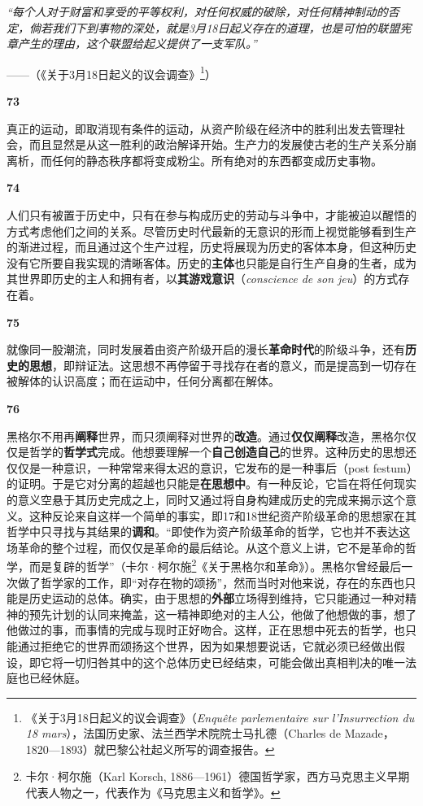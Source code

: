 \documentclass[fontset=fandol, a4paper, 12pt, openright]{ctexbook}
\makeatletter
\renewenvironment{quote}
  {\list{}{\rightmargin\leftmargin}%
   \item\relax\small\itshape\color{darkgray}}
  {\endlist}
\newcommand{\thesis}[1]{%
    \par\vspace{1.5em}%
    {\centering \textbf{\Large #1}\par}%
    \nobreak\vspace{0.5em}\nobreak
    \@afterindenttrue %
    \@afterheading    %
}
\makeatother
\begin{document}
\begin{quote}
“每个人对于财富和享受的平等权利，对任何权威的破除，对任何精神制动的否定，倘若我们下到事物的深处，就是3月18日起义存在的道理，也是可怕的联盟宪章产生的理由，这个联盟给起义提供了一支军队。”

\begin{flushright}
——（《关于3月18日起义的议会调查》\footnote{《关于3月18日起义的议会调查》（\textit{Enquête parlementaire sur l'Insurrection du 18 mars}），法国历史家、法兰西学术院院士马扎德（Charles de Mazade，1820—1893）就巴黎公社起义所写的调查报告。}）
\end{flushright}
\end{quote}

\thesis{73}
真正的运动，即取消现有条件的运动，从资产阶级在经济中的胜利出发去管理社会，而且显然是从这一胜利的政治解译开始。生产力的发展使古老的生产关系分崩离析，而任何的静态秩序都将变成粉尘。所有绝对的东西都变成历史事物。

\thesis{74}
人们只有被置于历史中，只有在参与构成历史的劳动与斗争中，才能被迫以醒悟的方式考虑他们之间的关系。尽管历史时代最新的无意识的形而上视觉能够看到生产的渐进过程，而且通过这个生产过程，历史将展现为历史的客体本身，但这种历史没有它所要自我实现的清晰客体。历史的\textbf{主体}也只能是自行生产自身的生者，成为其世界即历史的主人和拥有者，以\textbf{其游戏意识}（\textit{conscience de son jeu}）的方式存在着。

\thesis{75}
就像同一股潮流，同时发展着由资产阶级开启的漫长\textbf{革命时代}的阶级斗争，还有\textbf{历史的思想}，即辩证法。这思想不再停留于寻找存在者的意义，而是提高到一切存在被解体的认识高度；而在运动中，任何分离都在解体。

\thesis{76}
黑格尔不用再\textbf{阐释}世界，而只须阐释对世界的\textbf{改造}。通过\textbf{仅仅阐释}改造，黑格尔仅仅是哲学的\textbf{哲学式}完成。他想要理解一个\textbf{自己创造自己}的世界。这种历史的思想还仅仅是一种意识，一种常常来得太迟的意识，它发布的是一种事后（post festum）的证明。于是它对分离的超越也只能是\textbf{在思想中}。有一种反论，它旨在将任何现实的意义空悬于其历史完成之上，同时又通过将自身构建成历史的完成来揭示这个意义。这种反论来自这样一个简单的事实，即17和18世纪资产阶级革命的思想家在其哲学中只寻找与其结果的\textbf{调和}。“即使作为资产阶级革命的哲学，它也并不表达这场革命的整个过程，而仅仅是革命的最后结论。从这个意义上讲，它不是革命的哲学，而是复辟的哲学”（卡尔·柯尔施\footnote{卡尔·柯尔施（Karl Korsch, 1886—1961）德国哲学家，西方马克思主义早期代表人物之一，代表作为《马克思主义和哲学》。}《关于黑格尔和革命》）。黑格尔曾经最后一次做了哲学家的工作，即“对存在物的颂扬”，然而当时对他来说，存在的东西也只能是历史运动的总体。确实，由于思想的\textbf{外部}立场得到维持，它只能通过一种对精神的预先计划的认同来掩盖，这一精神即绝对的主人公，他做了他想做的事，想了他做过的事，而事情的完成与现时正好吻合。这样，正在思想中死去的哲学，也只能通过拒绝它的世界而颂扬这个世界，因为如果想要说话，它就必须已经做出假设，即它将一切归咎其中的这个总体历史已经结束，可能会做出真相判决的唯一法庭也已经休庭。
\end{document}
